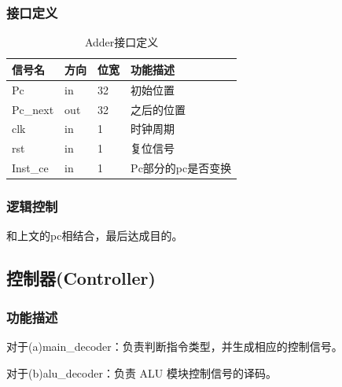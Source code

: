 \subsubsection{接口定义}
\begin{table}[htp]
	\caption{Adder接口定义}\label{tab:adderdef}
	\begin{center}
		\begin{tabular}{|l|l|l|p{6cm}|}
		\hline
		\textbf{信号名} & \textbf{方向} & \textbf{位宽} & \textbf{功能描述}\\ \hline \hline
		Pc          & in    & 32    & 初始位置\\ 
		Pc\_next    & out   & 32    & 之后的位置\\ 
		clk         & in    & 1     & 时钟周期\\ 
		rst         & in    & 1     & 复位信号\\ 
		Inst\_ce    & in    & 1     & Pc部分的pc是否变换\\ 
		\hline
		\end{tabular}
	\end{center}
	\end{table}
\subsubsection{逻辑控制}
和上文的pc相结合，最后达成目的。
\subsection{控制器(Controller)}\label{sub:controller}
\subsubsection{功能描述}
对于(a)main\_decoder：负责判断指令类型，并生成相应的控制信号。

对于(b)alu\_decoder：负责 ALU 模块控制信号的译码。
